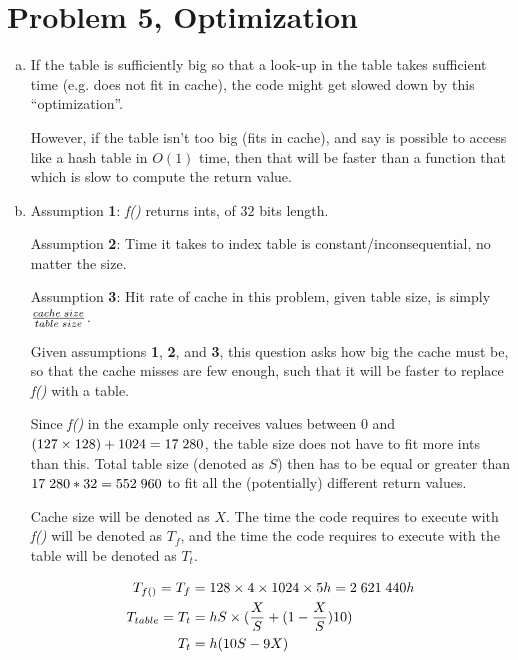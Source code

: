 \documentclass[fontsize=11pt, paper=a4, titlepage]{article}
\begin{document}
\section{Problem 5, Optimization}
\begin{enumerate}[a)]

    \item If the table is sufficiently big so that a look-up in the table takes
sufficient time (e.g. does not fit in cache), the code might get slowed down by this ``optimization''.

However, if the table isn't too big (fits in cache), and say is possible to
access like a hash table in $O(1)$ time, then that will be faster than a
function that which is slow to compute the return value.

    \item Assumption \textbf{1}: \textit{f()} returns ints, of $32$ bits length.

Assumption \textbf{2}: Time it takes to index table is constant/inconsequential,
no matter the size.

Assumption \textbf{3}: Hit rate of cache in this problem,
given table size, is simply $\frac{cache\thickspace size}{table\thickspace size}$.

Given assumptions \textbf{1}, \textbf{2}, and \textbf{3}, this question asks how
big the cache must be, so that the cache misses are few enough, such that it
will be faster to replace \textit{f()} with a table.

Since \textit{f()} in the example only receives values between $0$ and
$(127\times 128) + 1024 = 17\thickspace 280$, the table size does not have to
fit more ints than this. Total table size (denoted as $S$) then has to be equal
or greater than $17\thickspace 280*32 = 552\thickspace 960$ to fit all the
(potentially) different return values.

Cache size will be denoted as $X$. The time the code requires to execute with
\textit{f()} will be denoted as $T_f$, and the time the code requires to execute
with the table will be denoted as $T_t$.

    \begin{align*}
        T_{f()} = T_f &= 128\times 4\times 1024\times 5h
        = 2\thickspace 621\thickspace 440h \\
        T_{table} = T_t &= hS\times(\frac{X}{S} + (1-\frac{X}{S})10)\\
        T_t &= h(10S- 9X)
    \end{align*}


\end{enumerate}
\end{document}
